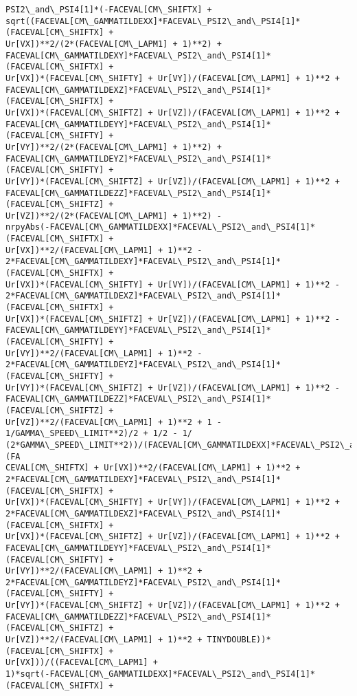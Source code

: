 \documentclass[landscape,letterpaper,10pt,english]{article}
\begin{document}
\begin{Verbatim}[commandchars=\\\{\}]
PSI2\_and\_PSI4[1]*(-FACEVAL[CM\_SHIFTX] +
sqrt((FACEVAL[CM\_GAMMATILDEXX]*FACEVAL\_PSI2\_and\_PSI4[1]*(FACEVAL[CM\_SHIFTX] +
Ur[VX])**2/(2*(FACEVAL[CM\_LAPM1] + 1)**2) +
FACEVAL[CM\_GAMMATILDEXY]*FACEVAL\_PSI2\_and\_PSI4[1]*(FACEVAL[CM\_SHIFTX] +
Ur[VX])*(FACEVAL[CM\_SHIFTY] + Ur[VY])/(FACEVAL[CM\_LAPM1] + 1)**2 +
FACEVAL[CM\_GAMMATILDEXZ]*FACEVAL\_PSI2\_and\_PSI4[1]*(FACEVAL[CM\_SHIFTX] +
Ur[VX])*(FACEVAL[CM\_SHIFTZ] + Ur[VZ])/(FACEVAL[CM\_LAPM1] + 1)**2 +
FACEVAL[CM\_GAMMATILDEYY]*FACEVAL\_PSI2\_and\_PSI4[1]*(FACEVAL[CM\_SHIFTY] +
Ur[VY])**2/(2*(FACEVAL[CM\_LAPM1] + 1)**2) +
FACEVAL[CM\_GAMMATILDEYZ]*FACEVAL\_PSI2\_and\_PSI4[1]*(FACEVAL[CM\_SHIFTY] +
Ur[VY])*(FACEVAL[CM\_SHIFTZ] + Ur[VZ])/(FACEVAL[CM\_LAPM1] + 1)**2 +
FACEVAL[CM\_GAMMATILDEZZ]*FACEVAL\_PSI2\_and\_PSI4[1]*(FACEVAL[CM\_SHIFTZ] +
Ur[VZ])**2/(2*(FACEVAL[CM\_LAPM1] + 1)**2) -
nrpyAbs(-FACEVAL[CM\_GAMMATILDEXX]*FACEVAL\_PSI2\_and\_PSI4[1]*(FACEVAL[CM\_SHIFTX] +
Ur[VX])**2/(FACEVAL[CM\_LAPM1] + 1)**2 -
2*FACEVAL[CM\_GAMMATILDEXY]*FACEVAL\_PSI2\_and\_PSI4[1]*(FACEVAL[CM\_SHIFTX] +
Ur[VX])*(FACEVAL[CM\_SHIFTY] + Ur[VY])/(FACEVAL[CM\_LAPM1] + 1)**2 -
2*FACEVAL[CM\_GAMMATILDEXZ]*FACEVAL\_PSI2\_and\_PSI4[1]*(FACEVAL[CM\_SHIFTX] +
Ur[VX])*(FACEVAL[CM\_SHIFTZ] + Ur[VZ])/(FACEVAL[CM\_LAPM1] + 1)**2 -
FACEVAL[CM\_GAMMATILDEYY]*FACEVAL\_PSI2\_and\_PSI4[1]*(FACEVAL[CM\_SHIFTY] +
Ur[VY])**2/(FACEVAL[CM\_LAPM1] + 1)**2 -
2*FACEVAL[CM\_GAMMATILDEYZ]*FACEVAL\_PSI2\_and\_PSI4[1]*(FACEVAL[CM\_SHIFTY] +
Ur[VY])*(FACEVAL[CM\_SHIFTZ] + Ur[VZ])/(FACEVAL[CM\_LAPM1] + 1)**2 -
FACEVAL[CM\_GAMMATILDEZZ]*FACEVAL\_PSI2\_and\_PSI4[1]*(FACEVAL[CM\_SHIFTZ] +
Ur[VZ])**2/(FACEVAL[CM\_LAPM1] + 1)**2 + 1 - 1/GAMMA\_SPEED\_LIMIT**2)/2 + 1/2 - 1/
(2*GAMMA\_SPEED\_LIMIT**2))/(FACEVAL[CM\_GAMMATILDEXX]*FACEVAL\_PSI2\_and\_PSI4[1]*(FA
CEVAL[CM\_SHIFTX] + Ur[VX])**2/(FACEVAL[CM\_LAPM1] + 1)**2 +
2*FACEVAL[CM\_GAMMATILDEXY]*FACEVAL\_PSI2\_and\_PSI4[1]*(FACEVAL[CM\_SHIFTX] +
Ur[VX])*(FACEVAL[CM\_SHIFTY] + Ur[VY])/(FACEVAL[CM\_LAPM1] + 1)**2 +
2*FACEVAL[CM\_GAMMATILDEXZ]*FACEVAL\_PSI2\_and\_PSI4[1]*(FACEVAL[CM\_SHIFTX] +
Ur[VX])*(FACEVAL[CM\_SHIFTZ] + Ur[VZ])/(FACEVAL[CM\_LAPM1] + 1)**2 +
FACEVAL[CM\_GAMMATILDEYY]*FACEVAL\_PSI2\_and\_PSI4[1]*(FACEVAL[CM\_SHIFTY] +
Ur[VY])**2/(FACEVAL[CM\_LAPM1] + 1)**2 +
2*FACEVAL[CM\_GAMMATILDEYZ]*FACEVAL\_PSI2\_and\_PSI4[1]*(FACEVAL[CM\_SHIFTY] +
Ur[VY])*(FACEVAL[CM\_SHIFTZ] + Ur[VZ])/(FACEVAL[CM\_LAPM1] + 1)**2 +
FACEVAL[CM\_GAMMATILDEZZ]*FACEVAL\_PSI2\_and\_PSI4[1]*(FACEVAL[CM\_SHIFTZ] +
Ur[VZ])**2/(FACEVAL[CM\_LAPM1] + 1)**2 + TINYDOUBLE))*(FACEVAL[CM\_SHIFTX] +
Ur[VX]))/((FACEVAL[CM\_LAPM1] +
1)*sqrt(-FACEVAL[CM\_GAMMATILDEXX]*FACEVAL\_PSI2\_and\_PSI4[1]*(FACEVAL[CM\_SHIFTX] +

\end{Verbatim}
\end{document}
